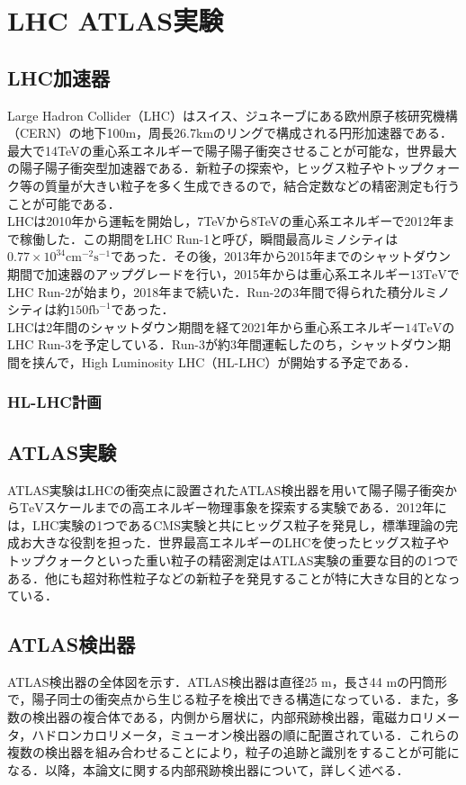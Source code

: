 \chapter{LHC ATLAS実験}

\section{LHC加速器}
Large Hadron Collider（LHC）はスイス、ジュネーブにある欧州原子核研究機構（CERN）の地下100m，周長26.7kmのリングで構成される円形加速器である．最大で14TeVの重心系エネルギーで陽子陽子衝突させることが可能な，世界最大の陽子陽子衝突型加速器である．新粒子の探索や，ヒッグス粒子やトップクォーク等の質量が大きい粒子を多く生成できるので，結合定数などの精密測定も行うことが可能である．\\
LHCは2010年から運転を開始し，7TeVから8TeVの重心系エネルギーで2012年まで稼働した．この期間をLHC Run-1と呼び，瞬間最高ルミノシティは$0.77\times10^{34} \mathrm{cm^{-2}s^{-1}}$であった．その後，2013年から2015年までのシャットダウン期間で加速器のアップグレードを行い，2015年からは重心系エネルギー$13\mathrm{TeV}$でLHC Run-2が始まり，2018年まで続いた．Run-2の3年間で得られた積分ルミノシティは約$150\mathrm{fb}^{-1}$であった．\\
LHCは2年間のシャットダウン期間を経て2021年から重心系エネルギー$14\mathrm{TeV}$のLHC Run-3を予定している．Run-3が約3年間運転したのち，シャットダウン期間を挟んで，High Luminosity LHC（HL-LHC）が開始する予定である．

\subsection{HL-LHC計画}


\section{ATLAS実験}
ATLAS実験はLHCの衝突点に設置されたATLAS検出器を用いて陽子陽子衝突から$\mathrm{TeV}$スケールまでの高エネルギー物理事象を探索する実験である．2012年には，LHC実験の1つであるCMS実験と共にヒッグス粒子を発見し，標準理論の完成お大きな役割を担った．世界最高エネルギーのLHCを使ったヒッグス粒子やトップクォークといった重い粒子の精密測定はATLAS実験の重要な目的の1つである．他にも超対称性粒子などの新粒子を発見することが特に大きな目的となっている．

\section{ATLAS検出器}
ATLAS検出器の全体図を示す．ATLAS検出器は直径25 $\mathrm{m}$，長さ44 $\mathrm{m}$の円筒形で，陽子同士の衝突点から生じる粒子を検出できる構造になっている．また，多数の検出器の複合体である，内側から層状に，内部飛跡検出器，電磁カロリメータ，ハドロンカロリメータ，ミューオン検出器の順に配置されている．これらの複数の検出器を組み合わせることにより，粒子の追跡と識別をすることが可能になる．以降，本論文に関する内部飛跡検出器について，詳しく述べる．

